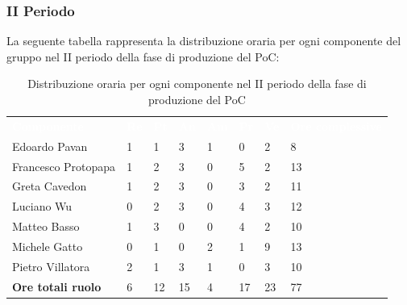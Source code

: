 \subsubsection{II Periodo}
La seguente tabella rappresenta la distribuzione oraria per ogni componente del gruppo nel II periodo della fase di produzione del PoC:
\begin{table}[H]
\begin{center}
\renewcommand{\arraystretch}{1.25}
\begin{tabular}{ m{}<{\centering}  m{}<{\centering} m{}<{\centering} m{}<{\centering}  m{}<{\centering}  m{}<{\centering}  m{}<{\centering}  m{}<{\centering}   }
	\rowcolor{darkblue}
	\textcolor{white}{\textbf{Componente}} &\textcolor{white}{\textbf{Re}}&\textcolor{white}{\textbf{Pt}}&\textcolor{white}{\textbf{An}}&\textcolor{white}{\textbf{Am}}&\textcolor{white}{\textbf{Pr}}&\textcolor{white}{\textbf{Ve}}&\textcolor{white}{\textbf{Ore complessive}}\\ 
	Edoardo Pavan & 1 & 1 & 3 & 1 & 0 & 2 & 8 \\	
	
	Francesco Protopapa & 1 & 2 & 3 & 0 & 5 & 2 & 13 \\

	Greta Cavedon & 1 & 2 & 3 & 0 & 3 & 2 & 11 \\
	
	Luciano Wu & 0 & 2 & 3 & 0 & 4 & 3 & 12\\
	
	Matteo Basso & 1 & 3 & 0 & 0 & 4 & 2 & 10 \\
	
	Michele Gatto &  0 & 1 & 0 & 2 & 1 & 9 & 13\\
	
	Pietro Villatora & 2 & 1 & 3 & 1 & 0 & 3 & 10 \\
	
	\textbf{Ore totali ruolo} & 6 & 12 & 15 & 4 & 17 & 23 & 77\\

\end{tabular}
\caption{Distribuzione oraria per ogni componente nel II periodo della fase di produzione del PoC}
\end{center}
\end{table}

